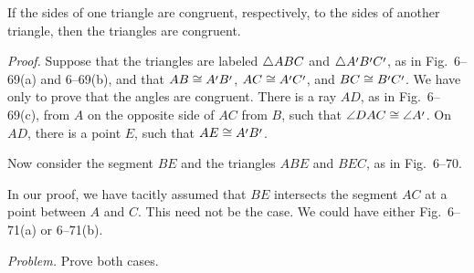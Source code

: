 \documentclass[11pt]{book}
\begin{document}
\begin{theorem}
If the sides of one triangle are congruent, respectively, to the sides of
another triangle, then the triangles are congruent.
\end{theorem}

\FIGVISIXTYNINE

\emph{Proof.} Suppose that the triangles are labeled $\triangle ABC$ and
$\tri{A\VIpr B\VIpr C\VIpr}$, as in Fig.~6--69(a) and 6--69(b), and that $AB
\cong A\VIpr B\VIpr$, $AC \cong A\VIpr C\VIpr$, and $BC \cong B\VIpr C\VIpr$.
We have only to prove that the angles are congruent. There is a ray $AD$, as in
Fig.~6--69(c), from $A$ on the opposite side of $AC$ from $B$, such that
$\ang{DAC} \cong \ang{A\VIpr}$. On $AD$, there is a point $E$, such that $AE
\cong A\VIpr B\VIpr$.

\begin{steps}
\end{steps}

Now consider the segment $BE$ and the triangles $ABE$ and $BEC$, as in
Fig.~6--70.

\FIGVISEVENTY

\begin{steps}
\end{steps}

\begin{remark}
In our proof, we have tacitly assumed that $BE$ intersects the segment $AC$ at
a point between $A$ and $C$. This need not be the case. We could have either
Fig.~6--71(a) or 6--71(b).

\par\medskip\noindent\emph{Problem.} Prove both cases.
\end{remark}

\FIGVISEVENTYONE
\end{document}
